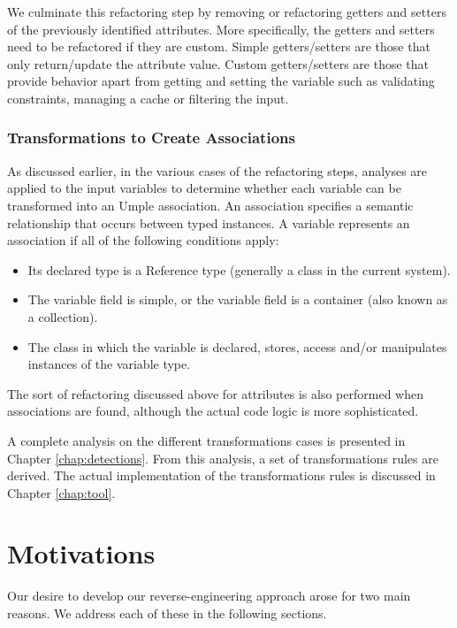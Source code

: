 We culminate this refactoring step by removing or refactoring getters and setters of the previously identified attributes. More specifically, the getters and setters need to be refactored if they are custom. Simple getters/setters are those that only return/update the attribute value.  Custom getters/setters are those that provide behavior apart from getting and setting the variable such as validating constraints, managing a cache or filtering the input.

\subsubsection{Transformations to Create Associations}

As discussed earlier, in the various cases of the refactoring steps, analyses are applied to the input variables to determine whether each variable can be transformed into an Umple association. An association specifies a semantic relationship that occurs between typed instances. A variable represents an association if all of the following conditions apply:

\begin{itemize}
\item Its declared type is a Reference type (generally a class in the current system).
\item The variable field is simple, or the variable field is a container (also known as a collection).
\item The class in which the variable is declared, stores, access and/or manipulates instances of the variable type.

\end{itemize}

The sort of refactoring discussed above for attributes is also performed when associations are found, although the actual code logic is more sophisticated.

A complete analysis on the different transformations cases is presented in Chapter \ref{chap:detections}. From this analysis, a set of transformations rules are derived. The actual implementation of the transformations rules is discussed in Chapter \ref{chap:tool}.


\section{Motivations}

Our desire to develop our reverse-engineering approach arose for two main reasons. We address each of these in the following sections.

